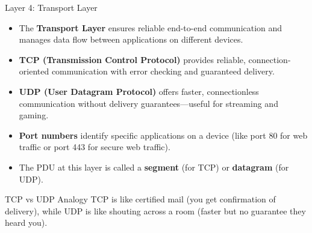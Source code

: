 \documentclass[aspectratio=169]{beamer}
\begin{document}
\begin{frame}{Layer 4: Transport Layer}

\begin{itemize}
    \item The \textbf{Transport Layer} ensures reliable end-to-end communication and manages data flow between applications on different devices.
    \item \textbf{TCP (Transmission Control Protocol)} provides reliable, connection-oriented communication with error checking and guaranteed delivery.
    \item \textbf{UDP (User Datagram Protocol)} offers faster, connectionless communication without delivery guarantees—useful for streaming and gaming.
    \item \textbf{Port numbers} identify specific applications on a device (like port 80 for web traffic or port 443 for secure web traffic).
    \item The PDU at this layer is called a \textbf{segment} (for TCP) or \textbf{datagram} (for UDP).
\end{itemize}

\vspace{0.3cm}

\begin{block}{TCP vs UDP Analogy}
TCP is like certified mail (you get confirmation of delivery), while UDP is like shouting across a room (faster but no guarantee they heard you).
\end{block}

\end{frame}
\end{document}
